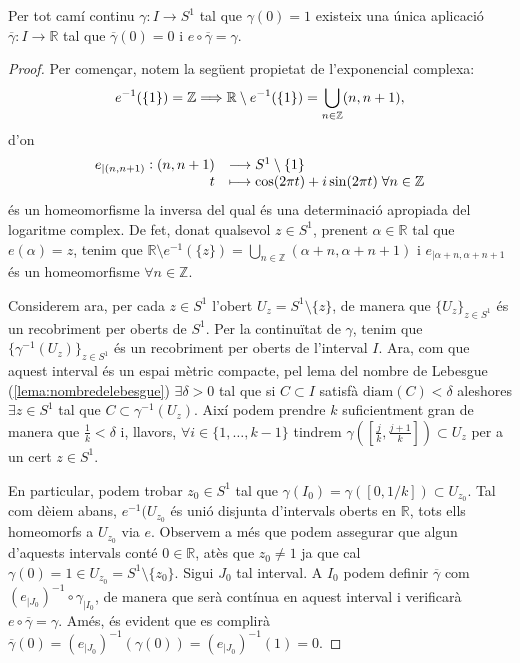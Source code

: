 \documentclass[../main.tex]{subfiles}
\begin{document}
\begin{lema}
\label{lema:elevaciodecamins} Per tot camí continu $\gamma:I\rightarrow S^1$ tal que $\gamma(0) = 1$ existeix una única aplicació $\overline{\gamma}:I\rightarrow \mathbb{R}$ tal que $\overline{\gamma}(0)=0$ i $e\circ\overline{\gamma} = \gamma$.
\end{lema}
\begin{proof}
Per començar, notem la següent propietat de l'exponencial complexa:
\begin{equation}
    \notag
    e^{-1}(\{1\}) = \mathbb{Z} \Longrightarrow \mathbb{R}\setminus e^{-1}(\{1\}) = \bigcup_{n\in\mathbb{Z}}(n,n+1),
\end{equation}
d'on
\begin{equation}
    \notag
    \begin{array}{rl}
        e_{|(n,n+1)}:(n,n+1) & \longrightarrow S^1\setminus\{1\} \\
        t & \longmapsto \cos(2\pi t)+i\sin(2\pi t)\;\forall n\in\mathbb{Z}
    \end{array}
\end{equation}
és un homeomorfisme la inversa del qual és una determinació apropiada del logaritme complex. De fet, donat qualsevol $z\in S^1$, prenent $\alpha\in\mathbb{R}$ tal que $e(\alpha) = z$, tenim que $\mathbb{R}\setminus e^{-1}(\{z\}) = \bigcup_{n\in\mathbb{Z}}(\alpha+n,\alpha+n+1)$ i $e_{|\alpha+n,\alpha+n+1}$ és un homeomorfisme $\forall n\in\mathbb{Z}$.

Considerem ara, per cada $z\in S^1$ l'obert $U_z = S^1\setminus \{z\}$, de manera que $\{U_z\}_{z\in S^1}$ és un recobriment per oberts de $S^1$. Per la continuïtat de $\gamma$, tenim que $\{\gamma^{-1}(U_z)\}_{z\in S^1}$ és un recobriment per oberts de l'interval $I$. Ara, com que aquest interval és un espai mètric compacte, pel lema del nombre de Lebesgue (\ref{lema:nombredelebesgue}) $\exists\delta>0$ tal que si $C\subset I$ satisfà $\mathrm{diam}(C)<\delta$ aleshores $\exists z\in S^1$ tal que $C\subset\gamma^{-1}(U_z)$. Així podem prendre $k$ suficientment gran de manera que $\frac{1}{k}<\delta$ i, llavors, $\forall i\in\{1,\ldots,k-1\}$ tindrem $\gamma\left(\left[\frac{j}{k},\frac{j+1}{k}\right]\right)\subset U_z$ per a un cert $z\in S^1$.

En particular, podem trobar $z_0\in S^1$ tal que $\gamma(I_0) = \gamma([0,1/k])\subset U_{z_0}$. Tal com dèiem abans, $e^{-1}(U_{z_0}$ és unió disjunta d'intervals oberts en $\mathbb{R}$, tots ells homeomorfs a $U_{z_0}$ via $e$. Observem a més que podem assegurar que algun d'aquests intervals conté $0\in\mathbb{R}$, atès que $z_0\not=1$ ja que cal $\gamma(0) = 1\in U_{z_0} = S^1\setminus\{z_0\}$. Sigui $J_0$ tal interval. A $I_0$ podem definir $\overline{\gamma}$ com $(e_{|J_0})^{-1}\circ\gamma_{|I_0}$, de manera que serà contínua en aquest interval i verificarà $e\circ\overline{\gamma} = \gamma$. Amés, és evident que es complirà $\overline{\gamma}(0) = (e_{|J_0})^{-1}(\gamma(0)) = (e_{|J_0})^{-1}(1) = 0$.


\end{proof}
\end{document}
